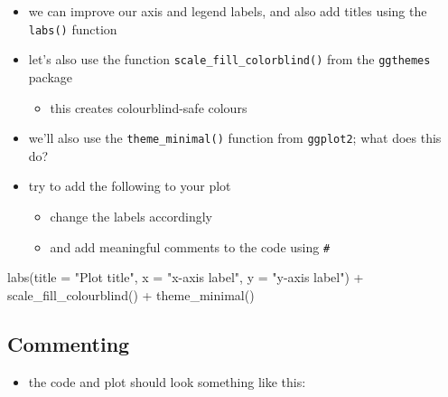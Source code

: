\documentclass[
  letterpaper,
  DIV=11]{scrartcl}
\newenvironment{Shaded}{\begin{snugshade}}{\end{snugshade}}
\newcommand{\AttributeTok}[1]{\textcolor[rgb]{0.40,0.45,0.13}{#1}}
\newcommand{\FunctionTok}[1]{\textcolor[rgb]{0.28,0.35,0.67}{#1}}
\newcommand{\NormalTok}[1]{\textcolor[rgb]{0.00,0.23,0.31}{#1}}
\newcommand{\SpecialCharTok}[1]{\textcolor[rgb]{0.37,0.37,0.37}{#1}}
\newcommand{\StringTok}[1]{\textcolor[rgb]{0.13,0.47,0.30}{#1}}
\providecommand{\tightlist}{%
  \setlength{\itemsep}{0pt}\setlength{\parskip}{0pt}}\usepackage{longtable,booktabs,array}
\theoremstyle{definition}
\theoremstyle{remark}
\begin{document}
\begin{itemize}
\item
  we can improve our axis and legend labels, and also add titles using
  the \texttt{labs()} function
\item
  let's also use the function \texttt{scale\_fill\_colorblind()} from
  the \texttt{ggthemes} package

  \begin{itemize}
  \tightlist
  \item
    this creates colourblind-safe colours
  \end{itemize}
\item
  we'll also use the \texttt{theme\_minimal()} function from
  \texttt{ggplot2}; what does this do?
\item
  try to add the following to your plot

  \begin{itemize}
  \tightlist
  \item
    change the labels accordingly
  \item
    and add meaningful comments to the code using \texttt{\#}
  \end{itemize}
\end{itemize}

\begin{Shaded}
\begin{Highlighting}[]
\FunctionTok{labs}\NormalTok{(}\AttributeTok{title =} \StringTok{"Plot title"}\NormalTok{,}
     \AttributeTok{x =} \StringTok{"x{-}axis label"}\NormalTok{,}
     \AttributeTok{y =} \StringTok{"y{-}axis label"}\NormalTok{) }\SpecialCharTok{+}
  \FunctionTok{scale\_fill\_colourblind}\NormalTok{() }\SpecialCharTok{+}
  \FunctionTok{theme\_minimal}\NormalTok{()}
\end{Highlighting}
\end{Shaded}

\hypertarget{commenting}{%
\subsection{Commenting}\label{commenting}}

\begin{itemize}
\tightlist
\item
  the code and plot should look something like this:
\end{itemize}
\end{document}
